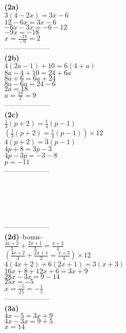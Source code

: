 \documentclass[11pt,a4paper]{article}
\begin{document}
\begin{flushleft}
\begin{minipage}{5.5cm}
{\bf (2a)}\\
$3(4-2x)=3x-6$\\
$12-6x=3x-6$\\
$-6x-3x=-6-12$\\
$-9x=-18$\\
$x=\frac{-18}{-9}=2$\\
{\color{blue} --------------------}\\
{\bf (2b)}\\
$4(2a-1)+10=6(4+a)$\\
$8a-4+10=24+6a$\\
$8a+6=6a+24$\\
$8a-6a=24-6$\\
$2a=18$\\
$a=\frac{18}{2}=9$\\
{\color{blue} --------------------}\\
{\bf (2c)}\\
$\frac{1}{3}(p+2)=\frac{1}{4}(p-1)$\\
$\left(\frac{1}{3}(p+2)=\frac{1}{4}(p-1)\right)\times 12$\\
$4(p+2)=3(p-1)$\\
$4p+8=3p-3$\\
$4p-3p=-3-8$\\
$p=-11$\\
{\color{blue} --------------------}\\
\\
\\
\\
\\
\end{minipage}
\begin{minipage}{6cm}
{\color{blue} --------------------}\\
{\bf (2d)}--bonus--\\
$\frac{4x+2}{3}+\frac{2x+1}{2}=\frac{x+3}{4}$\\
$\left(\frac{4x+2}{3}+\frac{2x+1}{2}=\frac{x+3}{4}\right)\times 12$\\
$4(4x+2)+6(2x+1)=3(x+3)$\\
$16x+8+12x+6=3x+9$\\
$28x-3x=9-14$\\
$25x=-5$\\
$x=\frac{-5}{25}=-\frac{1}{5}$\\
{\color{blue} --------------------}\\
{\bf (3a)}\\
$4x-5=3x+9$\\
$4x-3x=9+5$\\
$x=14$\\

\end{minipage}
\end{flushleft}
\end{document}
